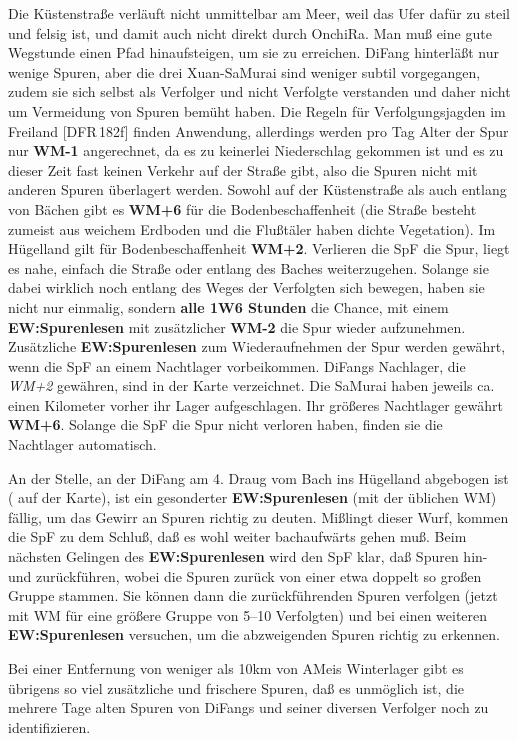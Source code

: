 \documentclass[
a4paper,
twoside,
DIV=calc,
BCOR=4mm,
fontsize=9pt,
twocolumn=on,
titlepage=on,
parskip=half
]{scrartcl}
\begin{document}
Die Küstenstraße verläuft nicht unmittelbar am Meer, weil das Ufer
dafür zu steil und felsig ist, und damit auch nicht direkt durch
OnchiRa. Man muß eine gute Wegstunde einen Pfad hinaufsteigen, um sie
zu erreichen. DiFang hinterläßt nur wenige Spuren, aber die drei
Xuan-SaMurai sind weniger subtil vorgegangen, zudem sie sich selbst
als Verfolger und nicht Verfolgte verstanden und daher nicht um
Vermeidung von Spuren bemüht haben. Die Regeln für Verfolgungsjagden
im Freiland [DFR\,182f] finden Anwendung, allerdings werden pro Tag
Alter der Spur nur \textbf{WM-1} angerechnet, da es zu keinerlei
Niederschlag gekommen ist und es zu dieser Zeit fast keinen Verkehr
auf der Straße gibt, also die Spuren nicht mit anderen Spuren
überlagert werden. Sowohl auf der Küstenstraße als auch entlang von
Bächen gibt es \textbf{WM+6} für die Bodenbeschaffenheit (die Straße
besteht zumeist aus weichem Erdboden und die Flußtäler haben dichte
Vegetation). Im Hügelland gilt für Bodenbeschaffenheit
\textbf{WM+2}. Verlieren die SpF die Spur, liegt es nahe, einfach die
Straße oder entlang des Baches weiterzugehen. Solange sie dabei
wirklich noch entlang des Weges der Verfolgten sich bewegen, haben sie
nicht nur einmalig, sondern \textbf{alle 1W6 Stunden} die Chance, mit
einem \textbf{EW:Spurenlesen} mit zusätzlicher \textbf{WM-2} die Spur
wieder aufzunehmen. Zusätzliche \textbf{EW:Spurenlesen} zum
Wiederaufnehmen der Spur werden gewährt, wenn die SpF an einem
Nachtlager vorbeikommen. DiFangs Nachlager, die \emph{WM+2} gewähren,
sind in der Karte verzeichnet. Die SaMurai haben jeweils ca. einen
Kilometer vorher ihr Lager aufgeschlagen. Ihr größeres Nachtlager
gewährt \textbf{WM+6}. Solange die SpF die Spur nicht verloren haben,
finden sie die Nachtlager automatisch.

An der Stelle, an der DiFang am 4. Draug vom Bach ins Hügelland
abgebogen ist ( auf der Karte), ist ein gesonderter
\textbf{EW:Spurenlesen} (mit der üblichen WM) fällig, um das Gewirr an
Spuren richtig zu deuten. Mißlingt dieser Wurf, kommen die SpF zu dem
Schluß, daß es wohl weiter bachaufwärts gehen muß. Beim nächsten
Gelingen des \textbf{EW:Spurenlesen} wird den SpF klar, daß Spuren
hin- und zurückführen, wobei die Spuren zurück von einer etwa doppelt
so großen Gruppe stammen. Sie können dann die zurückführenden Spuren
verfolgen (jetzt mit WM für eine größere Gruppe von 5--10 Verfolgten)
und bei  einen weiteren \textbf{EW:Spurenlesen} versuchen, um
die abzweigenden Spuren richtig zu erkennen.

Bei einer Entfernung von weniger als 10km von AMeis Winterlager gibt
es übrigens so viel zusätzliche und frischere Spuren, daß es unmöglich
ist, die mehrere Tage alten Spuren von DiFangs und seiner diversen
Verfolger noch zu identifizieren.
\end{document}
